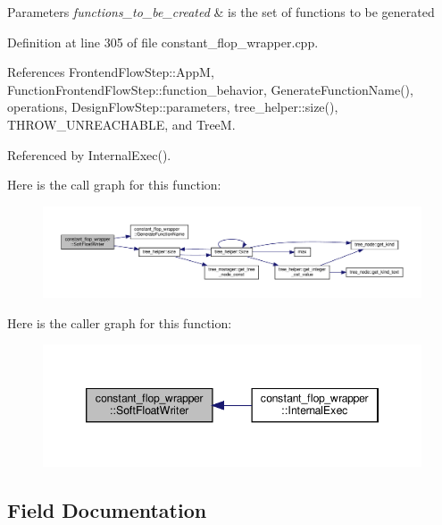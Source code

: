 \begin{DoxyParams}{Parameters}
{\em functions\+\_\+to\+\_\+be\+\_\+created} & is the set of functions to be generated \\
\hline
\end{DoxyParams}


Definition at line 305 of file constant\+\_\+flop\+\_\+wrapper.\+cpp.



References Frontend\+Flow\+Step\+::\+AppM, Function\+Frontend\+Flow\+Step\+::function\+\_\+behavior, Generate\+Function\+Name(), operations, Design\+Flow\+Step\+::parameters, tree\+\_\+helper\+::size(), T\+H\+R\+O\+W\+\_\+\+U\+N\+R\+E\+A\+C\+H\+A\+B\+LE, and TreeM.



Referenced by Internal\+Exec().

Here is the call graph for this function\+:
\nopagebreak
\begin{figure}[H]
\begin{center}
\leavevmode
\includegraphics[width=350pt]{d4/da9/classconstant__flop__wrapper_ad0bd18ed1418f981c85cb550f8453462_cgraph}
\end{center}
\end{figure}
Here is the caller graph for this function\+:
\nopagebreak
\begin{figure}[H]
\begin{center}
\leavevmode
\includegraphics[width=346pt]{d4/da9/classconstant__flop__wrapper_ad0bd18ed1418f981c85cb550f8453462_icgraph}
\end{center}
\end{figure}


\subsection{Field Documentation}
\mbox{\label{classconstant__flop__wrapper_ac063314f49be7c593e697c82116faee0}} 
